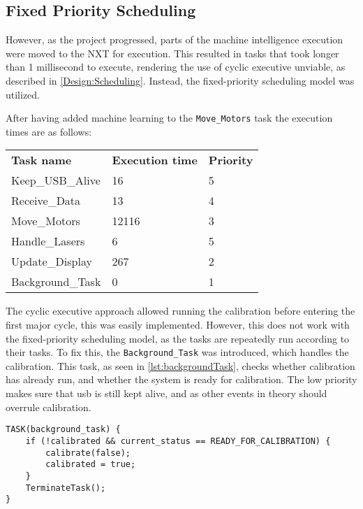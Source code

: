 \subsection{Fixed Priority Scheduling}
However, as the project progressed, parts of the machine intelligence execution were moved to the NXT for execution.
This resulted in tasks that took longer than 1 millisecond to execute, rendering the use of cyclic executive unviable, as described in \autoref{Design:Scheduling}.
Instead, the fixed-priority scheduling model was utilized.

After having added machine learning to the \texttt{Move\_Motors} task the execution times are as follows:

\begin{table}[H]
\begin{tabular}{lll}
\textbf{Task name}  & \textbf{Execution time} 	& \textbf{Priority}\\
Keep\_USB\_Alive    & 16                        & 5   \\
Receive\_Data       & 13                        & 4   \\
Move\_Motors        & 12116                     & 3   \\
Handle\_Lasers      & 6                         & 5   \\
Update\_Display     & 267                       & 2   \\
Background\_Task    & 0                         & 1   
\end{tabular}
\end{table}\label{table:executionTimes}

The cyclic executive approach allowed running the calibration before entering the first major cycle, this was easily implemented.
However, this does not work with the fixed-priority scheduling model, as the tasks are repeatedly run according to their tasks.
To fix this, the \texttt{Background\_Task} was introduced, which handles the calibration.
This task, as seen in \autoref{lst:backgroundTask}, checks whether calibration has already run, and whether the system is ready for calibration.
The low priority makes sure that usb is still kept alive, and as other events in theory should overrule calibration.

\begin{lstlisting}[language=CSharp,label={lst:backgroundTask},caption={Background task}]
TASK(background_task) {
	if (!calibrated && current_status == READY_FOR_CALIBRATION) {
		calibrate(false);
		calibrated = true;
	}
	TerminateTask();
}
\end{lstlisting}

